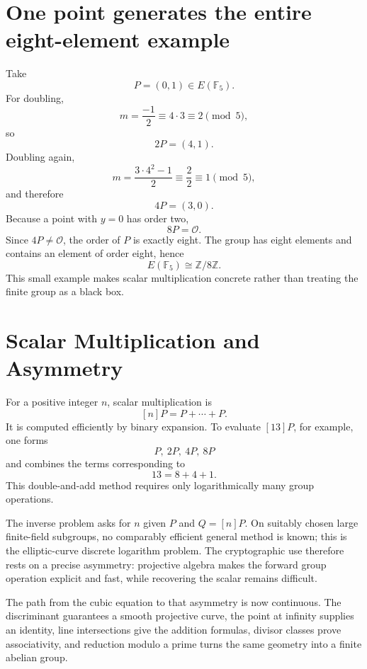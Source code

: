\section{One point generates the entire eight-element example}

Take
\[
  P=(0,1)\in E(\mathbb F_5).
\]
For doubling,
\[
  m=\frac{-1}{2}\equiv4\cdot3\equiv2\pmod5,
\]
so
\[
  2P=(4,1).
\]
Doubling again,
\[
  m=\frac{3\cdot4^2-1}{2}
  \equiv\frac2{2}\equiv1\pmod5,
\]
and therefore
\[
  4P=(3,0).
\]
Because a point with \(y=0\) has order two,
\[
  8P=\mathcal O.
\]
Since \(4P\ne\mathcal O\), the order of \(P\) is exactly eight.  The group has eight elements and contains an element of order eight, hence
\[
  E(\mathbb F_5)\cong\mathbb Z/8\mathbb Z.
\]
This small example makes scalar multiplication concrete rather than treating the finite group as a black box.

\section{Scalar Multiplication and Asymmetry}

For a positive integer \(n\), scalar multiplication is
\[
  [n]P=P+\cdots+P.
\]
It is computed efficiently by binary expansion.  To evaluate \([13]P\), for example, one forms
\[
  P,\ 2P,\ 4P,\ 8P
\]
and combines the terms corresponding to
\[
  13=8+4+1.
\]
This double-and-add method requires only logarithmically many group operations.

The inverse problem asks for \(n\) given \(P\) and \(Q=[n]P\).  On suitably chosen large finite-field subgroups, no comparably efficient general method is known; this is the elliptic-curve discrete logarithm problem.  The cryptographic use therefore rests on a precise asymmetry: projective algebra makes the forward group operation explicit and fast, while recovering the scalar remains difficult.

The path from the cubic equation to that asymmetry is now continuous.  The discriminant guarantees a smooth projective curve, the point at infinity supplies an identity, line intersections give the addition formulas, divisor classes prove associativity, and reduction modulo a prime turns the same geometry into a finite abelian group.